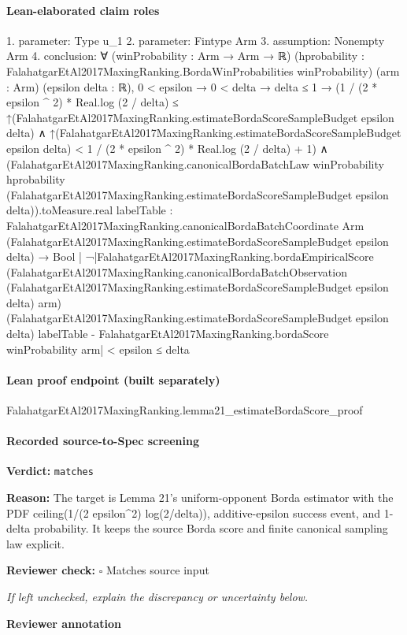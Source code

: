 \documentclass[10pt]{article}
\newcommand{\reviewerbox}{%
  \par\noindent\fbox{\parbox{0.96\linewidth}{\rule{0pt}{0.38in}}}\par
}
\newcommand{\reviewmatch}[1]{%
  \par\noindent\textbf{Reviewer check:} $\square$\; #1\par
  \noindent\emph{If left unchecked, explain the discrepancy or uncertainty below.}\par
}
\begin{document}
\paragraph{Lean-elaborated claim roles}\begin{ReviewVerbatim}
1. parameter: Type u_1
2. parameter: Fintype Arm
3. assumption: Nonempty Arm
4. conclusion: ∀ (winProbability : Arm → Arm → ℝ) (hprobability : FalahatgarEtAl2017MaxingRanking.BordaWinProbabilities winProbability)
  (arm : Arm) (epsilon delta : ℝ),
  0 < epsilon →
    0 < delta →
      delta ≤ 1 →
        (1 / (2 * epsilon ^ 2) * Real.log (2 / delta) ≤
              ↑(FalahatgarEtAl2017MaxingRanking.estimateBordaScoreSampleBudget epsilon delta) ∧
            ↑(FalahatgarEtAl2017MaxingRanking.estimateBordaScoreSampleBudget epsilon delta) <
              1 / (2 * epsilon ^ 2) * Real.log (2 / delta) + 1) ∧
          (FalahatgarEtAl2017MaxingRanking.canonicalBordaBatchLaw winProbability hprobability
                    (FalahatgarEtAl2017MaxingRanking.estimateBordaScoreSampleBudget epsilon delta)).toMeasure.real
              {labelTable :
                FalahatgarEtAl2017MaxingRanking.canonicalBordaBatchCoordinate Arm
                    (FalahatgarEtAl2017MaxingRanking.estimateBordaScoreSampleBudget epsilon delta) →
                  Bool |
                ¬|FalahatgarEtAl2017MaxingRanking.bordaEmpiricalScore
                          (FalahatgarEtAl2017MaxingRanking.canonicalBordaBatchObservation
                            (FalahatgarEtAl2017MaxingRanking.estimateBordaScoreSampleBudget epsilon delta) arm)
                          (FalahatgarEtAl2017MaxingRanking.estimateBordaScoreSampleBudget epsilon delta) labelTable -
                        FalahatgarEtAl2017MaxingRanking.bordaScore winProbability arm| <
                    epsilon} ≤
            delta
\end{ReviewVerbatim}

\paragraph{Lean proof endpoint (built separately)}\begin{ReviewVerbatim}
FalahatgarEtAl2017MaxingRanking.lemma21_estimateBordaScore_proof
\end{ReviewVerbatim}

\paragraph{Recorded source-to-Spec screening}
\textbf{Verdict:} \texttt{matches}
\\
{\raggedright
\textbf{Reason:} The target is Lemma 21's uniform-\allowbreak{}opponent Borda estimator with the PDF ceiling(1/\allowbreak{}(2 epsilon\textasciicircum{}2) log(2/\allowbreak{}delta)), additive-\allowbreak{}epsilon success event, and 1-\allowbreak{}delta probability.\allowbreak{} It keeps the source Borda score and finite canonical sampling law explicit.\allowbreak{}
\par}
\reviewmatch{Matches source input}
\noindent\textbf{Reviewer annotation}\par
\reviewerbox
\clearpage
\hypertarget{source-claim-2bb1c4a4cf5c6775}{}
\end{document}
